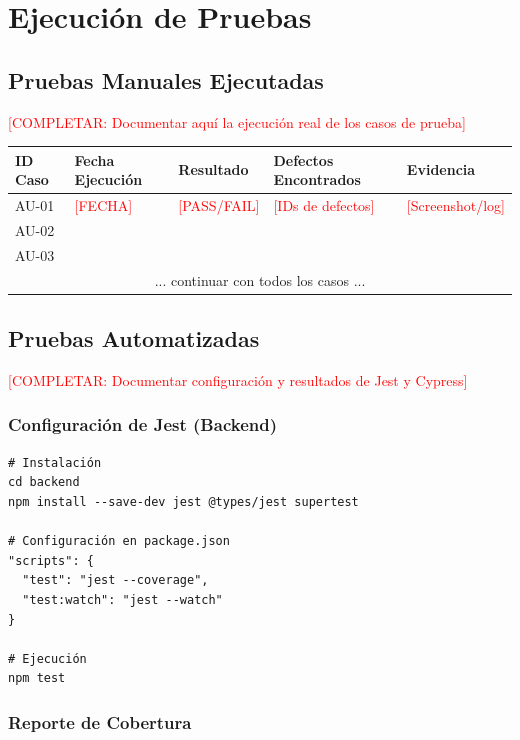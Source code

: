 \documentclass[12pt,a4paper]{article}
\begin{document}
\section{Ejecución de Pruebas}

\subsection{Pruebas Manuales Ejecutadas}

\textcolor{red}{[COMPLETAR: Documentar aquí la ejecución real de los casos de prueba]}

\begin{longtable}{|p{1.5cm}|p{2.5cm}|p{2cm}|p{3cm}|p{4cm}|}
\hline
\textbf{ID Caso} & \textbf{Fecha Ejecución} & \textbf{Resultado} & \textbf{Defectos Encontrados} & \textbf{Evidencia} \\
\hline
\endfirsthead
AU-01 & \textcolor{red}{[FECHA]} & \textcolor{red}{[PASS/FAIL]} & \textcolor{red}{[IDs de defectos]} & \textcolor{red}{[Screenshot/log]} \\
\hline
AU-02 & & & & \\
\hline
AU-03 & & & & \\
\hline
\multicolumn{5}{|c|}{... continuar con todos los casos ...} \\
\hline
\end{longtable}

\subsection{Pruebas Automatizadas}

\textcolor{red}{[COMPLETAR: Documentar configuración y resultados de Jest y Cypress]}

\subsubsection{Configuración de Jest (Backend)}

\begin{verbatim}
# Instalación
cd backend
npm install --save-dev jest @types/jest supertest

# Configuración en package.json
"scripts": {
  "test": "jest --coverage",
  "test:watch": "jest --watch"
}

# Ejecución
npm test
\end{verbatim}

\subsubsection{Reporte de Cobertura}
\end{document}
